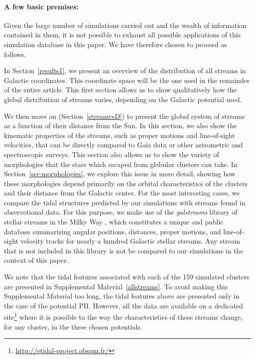    \paragraph{A few basic premises:}
    Given the large number of simulations carried out and the wealth of information contained in them, it is not possible to exhaust all possible applications of this simulation database in this paper. We have therefore chosen to proceed as follows. 

    In Section~\ref{results1}, we present an overview of the distribution of all streams in  Galactic coordinates. This coordinate space will be the one used in the remainder of the entire article. This first section allows us to show qualitatively how the global distribution of streams varies, depending on the Galactic potential used.

    We  then move on (Section~\ref{streamvsD}) to present the global system of streams as a function of their distance from the Sun. In this section, we also show the kinematic properties of the streams, such as proper motions and line-of-sight velocities, that can be directly compared to Gaia data or other astrometric and spectroscopic surveys. This section also allows us to show the variety of morphologies that the stars which escaped from globular clusters can take. In Section~\ref{sec:morphologies}, we explore this issue in more detail, showing how these morphologies depend primarily on the orbital characteristics of the clusters and their distance from the Galactic center. For the most interesting cases, we compare the tidal structures predicted by our simulations with streams found in observational data. For this purpose, we make use of the \emph{galstreams} library of stellar streams in the Milky Way \citep{2023MNRAS.520.5225M}, which constitutes a unique and public database summarizing angular positions, distances, proper motions, and line-of-sight velocity tracks for nearly a hundred Galactic stellar streams. Any stream that is not included in this library is not be compared to our simulations in the context of this paper.

    We note that the tidal features associated with each of the 159 simulated clusters are presented in Supplemental Material~\ref{allstreams}. To avoid making this Supplemental Material too long, the  tidal features above are presented only in the case of the potential PII. However, all the data are available on a dedicated site\footnote{\url{http://etidal-project.obspm.fr/}} where it is possible to  the way the characteristics of these streams change, for any cluster, in the three chosen potentials. 


